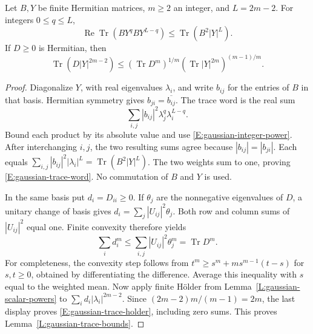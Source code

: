 \begin{lemma}\label{L:gaussian-trace-bounds}
  Let $B,Y$ be finite Hermitian matrices, $m \ge 2$ an integer, and
  $L = 2m-2$. For integers $0 \le q \le L$,
  \begin{equation}\label{E:gaussian-trace-word}
    \operatorname{Re}\operatorname{Tr}(BY^qBY^{L-q})
    \le \operatorname{Tr}(B^2|Y|^L).
  \end{equation}
  If $D \ge 0$ is Hermitian, then
  \begin{equation}\label{E:gaussian-trace-holder}
    \operatorname{Tr}(D|Y|^{2m-2})
    \le (\operatorname{Tr}D^m)^{1/m}
    (\operatorname{Tr}|Y|^{2m})^{(m-1)/m}.
  \end{equation}
\end{lemma}

\begin{proof}
  Diagonalize $Y$, with real eigenvalues $\lambda_i$, and write $b_{ij}$
  for the entries of $B$ in that basis. Hermitian symmetry gives
  $b_{ji} = \overline{b_{ij}}$. The trace word is the real sum
  \[
    \sum_{i,j}|b_{ij}|^2\lambda_j^q\lambda_i^{L-q}.
  \]
  Bound each product by its absolute value and use
  \eqref{E:gaussian-integer-power}. After interchanging $i,j$, the two
  resulting sums agree because $|b_{ij}|=|b_{ji}|$. Each equals
  $\sum_{i,j}|b_{ij}|^2|\lambda_i|^L
  =\operatorname{Tr}(B^2|Y|^L)$. The two weights sum to one, proving
  \eqref{E:gaussian-trace-word}. No commutation of $B$ and $Y$ is used.

  In the same basis put $d_i = D_{ii} \ge 0$. If $\theta_j$ are the
  nonnegative eigenvalues of $D$, a unitary change of basis gives
  $d_i=\sum_j|U_{ij}|^2\theta_j$. Both row and column sums of
  $|U_{ij}|^2$ equal one. Finite convexity therefore yields
  \[
    \sum_i d_i^m \le \sum_{i,j}|U_{ij}|^2\theta_j^m
    = \operatorname{Tr}D^m.
  \]
  For completeness, the convexity step follows from
  $t^m \ge s^m+ms^{m-1}(t-s)$ for $s,t \ge 0$, obtained by differentiating
  the difference. Average this inequality with $s$ equal to the weighted
  mean. Now apply finite H\"older from Lemma~\ref{L:gaussian-scalar-powers}
  to $\sum_i d_i|\lambda_i|^{2m-2}$. Since
  $(2m-2)m/(m-1)=2m$, the last display proves
  \eqref{E:gaussian-trace-holder}, including zero sums.
  This proves Lemma~\ref{L:gaussian-trace-bounds}.
\end{proof}


